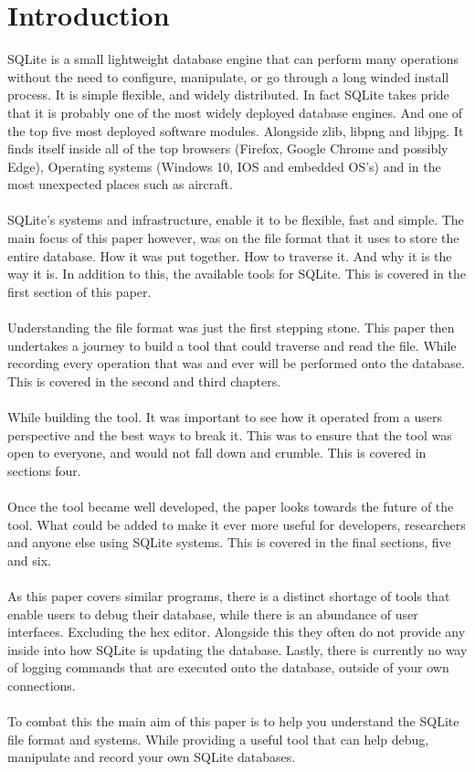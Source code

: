\section*{Introduction}
\label{sec:introduction}

SQLite is a small lightweight database engine that can perform many operations without the need to configure, manipulate, or go through a long winded install process. It is simple flexible, and widely distributed. In fact SQLite takes pride that it is probably one of the most widely deployed database engines. And one of the top five most deployed software modules. Alongside zlib, libpng and libjpg. It finds itself inside all of the top browsers (Firefox, Google Chrome and possibly Edge), Operating systems (Windows 10, IOS and embedded OS's) and in the most unexpected places such as aircraft.
\\\\
SQLite's systems and infrastructure, enable it to be flexible, fast and simple. The main focus of this paper however, was on the file format that it uses to store the entire database. How it was put together. How to traverse it. And why it is the way it is. In addition to this, the available tools for SQLite. This is covered in the first section of this paper.
\\\\
Understanding the file format was just the first stepping stone. This paper then undertakes a journey to build a tool that could traverse and read the file. While recording every operation that was and ever will be performed onto the database. This is covered in the second and third chapters.
\\\\
While building the tool. It was important to see how it operated from a users perspective and the best ways to break it. This was to ensure that the tool was open to everyone, and would not fall down and crumble. This is covered in sections four. 
\\\\
Once the tool became well developed, the paper looks towards the future of the tool. What could be added to make it ever more useful for developers, researchers and anyone else using SQLite systems. This is covered in the final sections, five and six.
\\\\
As this paper covers similar programs, there is a distinct shortage of tools that enable users to debug their database, while there is an abundance of user interfaces. Excluding the hex editor. Alongside this they often do not provide any inside into how SQLite is updating the database. Lastly, there is currently no way of logging commands that are executed onto the database, outside of your own connections.
\\\\
To combat this the main aim of this paper is to help you understand the SQLite file format and systems. While providing a useful tool that can help debug, manipulate and record your own SQLite databases.